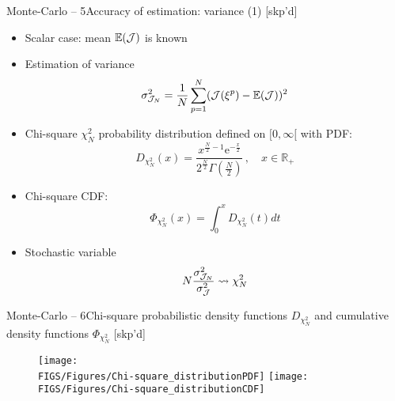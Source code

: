 \documentclass[10pt]{beamer}
\def\ds{\displaystyle}
\def\begit{\begin{itemize}}
\def\endit{\end{itemize}}
\newcommand{\iexp}{\mathrm{e}}
\newcommand{\esp}{{\mathbb E}}
\newcommand{\Rset}{{\mathbb R}}
\begin{document}
%
%
\begin{frame}{Monte-Carlo -- 5}{Accuracy of estimation: variance (1) [skp'd]} 
%
\begit
\item Scalar case: mean $\esp({\cal J})$ is known
%
\item Estimation of variance 
  $$\sigma_{{\cal J}_N}^2=\frac{1}{N}\ds\sum_{p=1}^{N} ({\cal J}(\xi^p)-\esp({\cal J}))^2$$
%
\item Chi-square $\chi^2_N$ probability distribution defined on $[0,\infty[$ with PDF:
    $$D_{\chi^2_N}(x)=\displaystyle\frac{x^{\frac{N}{2}-1}\iexp^{-\frac{x}{2}}}{2^\frac{N}{2}\Gamma(\frac{N}{2})}\,,\quad x\in\Rset_+$$
%
\item Chi-square CDF:
     $$\Phi_{\chi^2_N}(x) = \displaystyle\int_0^x D_{\chi^2_N}(t) dt$$
%
\item Stochastic variable $$ N \frac{\sigma_{{\cal J}_N}^2}{\sigma_{{\cal J}}^2} \leadsto \chi^2_N$$
\endit
%
\end{frame} 
%
%
\begin{frame}{Monte-Carlo -- 6}{Chi-square probabilistic density functions $D_{\chi^2_N}$ and cumulative density functions $\Phi_{\chi^2_N}$ [skp'd]} 
%
%
\begin{figure}
\texttt{[image: \\FIGS/Figures/Chi-square\_distributionPDF]}
\texttt{[image: \\FIGS/Figures/Chi-square\_distributionCDF]}
\end{figure}
%
\end{frame}
%
%
\end{document}
